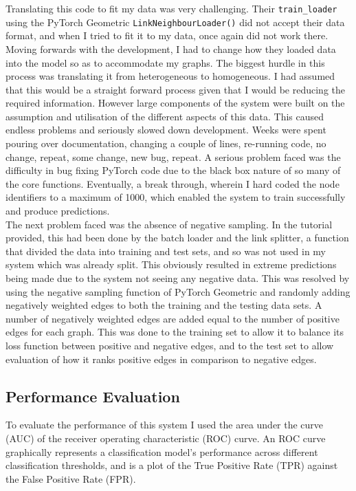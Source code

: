 \documentclass{l4proj}
\begin{document}
Translating this code to fit my data was very challenging. Their \texttt{train\_loader} using the PyTorch Geometric \texttt{LinkNeighbourLoader()} did not accept their data format, and when I tried to fit it to my data, once again did not work there. Moving forwards with the development, I had to change how they loaded data into the model so as to accommodate my graphs. The biggest hurdle in this process was translating it from heterogeneous to homogeneous. I had assumed that this would be a straight forward process given that I would be reducing the required information. However large components of the system were built on the assumption and utilisation of the different aspects of this data. This caused endless problems and seriously slowed down development. Weeks were spent pouring over documentation, changing a couple of lines, re-running code, no change, repeat, some change, new bug, repeat. A serious problem faced was the difficulty in bug fixing PyTorch code due to the black box nature of so many of the core functions. Eventually, a break through, wherein I hard coded the node identifiers to a maximum of 1000, which enabled the system to train successfully and produce predictions. \\

The next problem faced was the absence of negative sampling. In the tutorial provided, this had been done by the batch loader and the link splitter, a function that divided the data into training and test sets, and so was not used in my system which was already split. This obviously resulted in extreme predictions being made due to the system not seeing any negative data. This was resolved by using the negative sampling function of PyTorch Geometric and randomly adding negatively weighted edges to both the training and the testing data sets. A number of negatively weighted edges are added equal to the number of positive edges for each graph. This was done to the training set to allow it to balance its loss function between positive and negative edges, and to the test set to allow evaluation of how it ranks positive edges in comparison to negative edges. \\

\subsection{Performance Evaluation}

To evaluate the performance of this system I used the area under the curve (AUC) of the receiver operating characteristic (ROC) curve. An ROC curve graphically represents a classification model's performance across different classification thresholds, and is a plot of the True Positive Rate (TPR) against the False Positive Rate (FPR). \\
\end{document}
